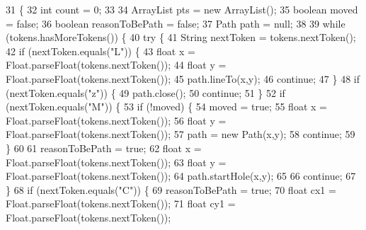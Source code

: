 \begin{DoxyCode}
31                                                                                                      \{
32         \textcolor{keywordtype}{int} count = 0;
33         
34         ArrayList pts = \textcolor{keyword}{new} ArrayList();
35         \textcolor{keywordtype}{boolean} moved = \textcolor{keyword}{false};
36         \textcolor{keywordtype}{boolean} reasonToBePath = \textcolor{keyword}{false};
37         Path path = null;
38         
39         \textcolor{keywordflow}{while} (tokens.hasMoreTokens()) \{
40             \textcolor{keywordflow}{try} \{
41                 String nextToken = tokens.nextToken();
42                 \textcolor{keywordflow}{if} (nextToken.equals(\textcolor{stringliteral}{"L"})) \{
43                     \textcolor{keywordtype}{float} x = Float.parseFloat(tokens.nextToken());
44                     \textcolor{keywordtype}{float} y = Float.parseFloat(tokens.nextToken());
45                     path.lineTo(x,y);
46                     \textcolor{keywordflow}{continue};
47                 \}
48                 \textcolor{keywordflow}{if} (nextToken.equals(\textcolor{stringliteral}{"z"})) \{
49                     path.close();
50                     \textcolor{keywordflow}{continue};
51                 \}
52                 \textcolor{keywordflow}{if} (nextToken.equals(\textcolor{stringliteral}{"M"})) \{
53                     \textcolor{keywordflow}{if} (!moved) \{
54                         moved = \textcolor{keyword}{true};
55                         \textcolor{keywordtype}{float} x = Float.parseFloat(tokens.nextToken());
56                         \textcolor{keywordtype}{float} y = Float.parseFloat(tokens.nextToken());
57                         path = \textcolor{keyword}{new} Path(x,y);
58                         \textcolor{keywordflow}{continue};
59                     \}
60     
61                     reasonToBePath = \textcolor{keyword}{true};
62                     \textcolor{keywordtype}{float} x = Float.parseFloat(tokens.nextToken());
63                     \textcolor{keywordtype}{float} y = Float.parseFloat(tokens.nextToken());
64                     path.startHole(x,y);
65                     
66                     \textcolor{keywordflow}{continue};
67                 \}
68                 \textcolor{keywordflow}{if} (nextToken.equals(\textcolor{stringliteral}{"C"})) \{
69                     reasonToBePath = \textcolor{keyword}{true};
70                     \textcolor{keywordtype}{float} cx1 = Float.parseFloat(tokens.nextToken());
71                     \textcolor{keywordtype}{float} cy1 = Float.parseFloat(tokens.nextToken());

\end{DoxyCode}

